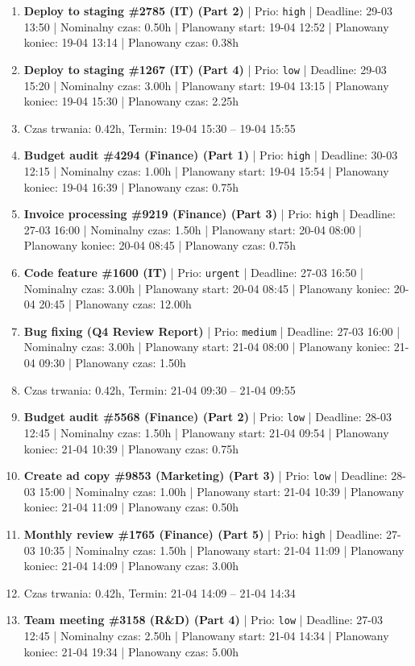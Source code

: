 {\begin{enumerate}
  \item [\textbf{14623}] \textbf{Deploy to staging \#2785 (IT) (Part 2)} | Prio: \texttt{high} | Deadline: 29-03 13:50 | Nominalny czas: 0.50h | Planowany start: 19-04 12:52 | Planowany koniec: 19-04 13:14 | Planowany czas: 0.38h
  \item [\textbf{14686}] \textbf{Deploy to staging \#1267 (IT) (Part 4)} | Prio: \texttt{low} | Deadline: 29-03 15:20 | Nominalny czas: 3.00h | Planowany start: 19-04 13:15 | Planowany koniec: 19-04 15:30 | Planowany czas: 2.25h
  \item [\textbf{PRZERWA}] Czas trwania: 0.42h, Termin: 19-04 15:30 -- 19-04 15:55
  \item [\textbf{14619}] \textbf{Budget audit \#4294 (Finance) (Part 1)} | Prio: \texttt{high} | Deadline: 30-03 12:15 | Nominalny czas: 1.00h | Planowany start: 19-04 15:54 | Planowany koniec: 19-04 16:39 | Planowany czas: 0.75h
  \item [\textbf{14622}] \textbf{Invoice processing \#9219 (Finance) (Part 3)} | Prio: \texttt{high} | Deadline: 27-03 16:00 | Nominalny czas: 1.50h | Planowany start: 20-04 08:00 | Planowany koniec: 20-04 08:45 | Planowany czas: 0.75h
  \item [\textbf{14605}] \textbf{Code feature \#1600 (IT)} | Prio: \texttt{urgent} | Deadline: 27-03 16:50 | Nominalny czas: 3.00h | Planowany start: 20-04 08:45 | Planowany koniec: 20-04 20:45 | Planowany czas: 12.00h
  \item [\textbf{14647}] \textbf{Bug fixing (Q4 Review Report)} | Prio: \texttt{medium} | Deadline: 27-03 16:00 | Nominalny czas: 3.00h | Planowany start: 21-04 08:00 | Planowany koniec: 21-04 09:30 | Planowany czas: 1.50h
  \item [\textbf{PRZERWA}] Czas trwania: 0.42h, Termin: 21-04 09:30 -- 21-04 09:55
  \item [\textbf{14693}] \textbf{Budget audit \#5568 (Finance) (Part 2)} | Prio: \texttt{low} | Deadline: 28-03 12:45 | Nominalny czas: 1.50h | Planowany start: 21-04 09:54 | Planowany koniec: 21-04 10:39 | Planowany czas: 0.75h
  \item [\textbf{14679}] \textbf{Create ad copy \#9853 (Marketing) (Part 3)} | Prio: \texttt{low} | Deadline: 28-03 15:00 | Nominalny czas: 1.00h | Planowany start: 21-04 10:39 | Planowany koniec: 21-04 11:09 | Planowany czas: 0.50h
  \item [\textbf{14627}] \textbf{Monthly review \#1765 (Finance) (Part 5)} | Prio: \texttt{high} | Deadline: 27-03 10:35 | Nominalny czas: 1.50h | Planowany start: 21-04 11:09 | Planowany koniec: 21-04 14:09 | Planowany czas: 3.00h
  \item [\textbf{PRZERWA}] Czas trwania: 0.42h, Termin: 21-04 14:09 -- 21-04 14:34
  \item [\textbf{14688}] \textbf{Team meeting \#3158 (R\&D) (Part 4)} | Prio: \texttt{low} | Deadline: 27-03 12:45 | Nominalny czas: 2.50h | Planowany start: 21-04 14:34 | Planowany koniec: 21-04 19:34 | Planowany czas: 5.00h
\end{enumerate}
}

